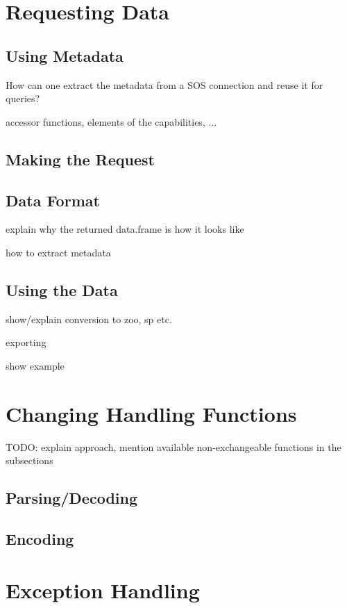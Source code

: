 \documentclass{article}
\begin{document}
\section{Requesting Data}

\subsection{Using Metadata}

How can one extract the metadata from a SOS connection and reuse it for queries?

accessor functions, elements of the capabilities, ...


\subsection{Making the Request}

\subsection{Data Format}

explain why the returned data.frame is how it looks like

how to extract metadata


\subsection{Using the Data}

show/explain conversion to zoo, sp etc.

exporting

show example

\section{Changing Handling Functions}

TODO: explain approach, mention available non-exchangeable functions in the subsections

\subsection{Parsing/Decoding}

\subsection{Encoding}



\section{Exception Handling}
\end{document}
